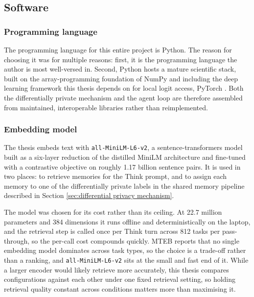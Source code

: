 \subsection{Software}

\subsubsection{Programming language}
The programming language for this entire project is Python. The reason for choosing it was for multiple reasons: first, it is the programming language the author is most well-versed in. Second, Python hosts a mature scientific stack, built on the array-programming foundation of NumPy \citep{harris2020array} and including the deep learning framework this thesis depends on for local logit access, PyTorch \citep{paszke2019pytorch}. Both the differentially private mechanism and the agent loop are therefore assembled from maintained, interoperable libraries rather than reimplemented.

\subsubsection{Embedding model}\label{sec:embedding-model}
The thesis embeds text with \texttt{all-MiniLM-L6-v2}, a sentence-transformers model \citep{reimers2019sentencebert} built as a six-layer reduction of the distilled MiniLM architecture \citep{wang2020minilm} and fine-tuned with a contrastive objective on roughly 1.17 billion sentence pairs. It is used in two places: to retrieve memories for the Think prompt, and to assign each memory to one of the differentially private labels in the shared memory pipeline described in Section \ref{sec:differential privacy mechanism}.

The model was chosen for its cost rather than its ceiling. At 22.7 million parameters and 384 dimensions it runs offline and deterministically on the laptop, and the retrieval step is called once per Think turn across 812 tasks per pass-through, so the per-call cost compounds quickly. MTEB \citep{muennighoff2023mteb} reports that no single embedding model dominates across task types, so the choice is a trade-off rather than a ranking, and \texttt{all-MiniLM-L6-v2} sits at the small and fast end of it. While a larger encoder would likely retrieve more accurately, this thesis compares configurations against each other under one fixed retrieval setting, so holding retrieval quality constant across conditions matters more than maximising it.

